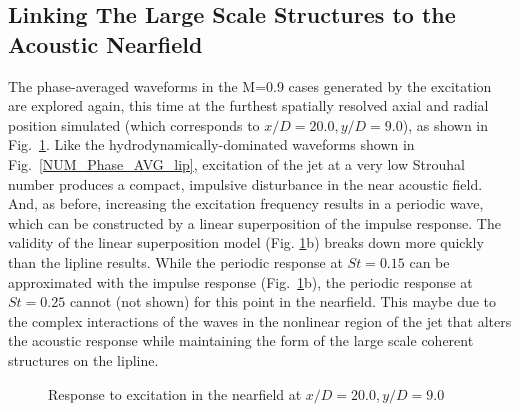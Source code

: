 \documentclass[english]{aiaa-tc}
\begin{document}
\subsection{Linking The Large Scale Structures to the Acoustic Nearfield}
The phase-averaged waveforms in the M=0.9 cases generated by the excitation are explored again, this time at the furthest spatially resolved axial and radial position simulated (which corresponds to $x/D = 20.0, y/D = 9.0$), as shown in Fig.~\ref{NUM_FF}.
Like the hydrodynamically-dominated waveforms shown in Fig.~\ref{NUM_Phase_AVG_lip}, excitation of the jet at a very low Strouhal number produces a compact, impulsive disturbance in the near acoustic field.
And, as before, increasing the excitation frequency results in a periodic wave, which can be constructed by a linear superposition of the impulse response. 
The validity of the linear superposition model (Fig. \ref{NUM_FF}b) breaks down more quickly than the lipline results.
While the periodic response at $St = 0.15$ can be approximated with the impulse response (Fig.~\ref{NUM_FF}b), the periodic response at $St = 0.25$ cannot (not shown) for this point in the nearfield. This maybe due to the complex interactions of the waves in the nonlinear region of the jet that alters the acoustic response while maintaining the form of the large scale coherent structures on the lipline.
\begin{figure}
	\centering{}
	\caption{Response to excitation in the nearfield at $x/D = 20.0, y/D = 9.0$}\label{NUM_FF}
\end{figure}
\end{document}
